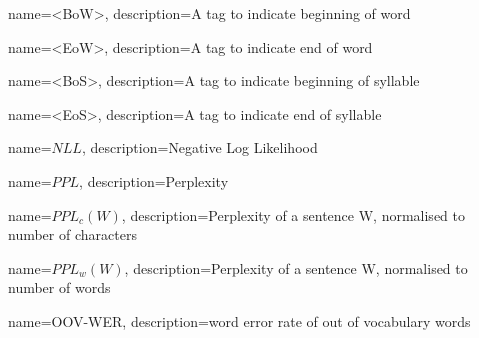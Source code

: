 {   name={\ipa <BoW>},
    description={A tag to indicate beginning of word}
}

{   name={\ipa <EoW>},
    description={A tag to indicate end of word}
}

{   name={\ipa <BoS>},
    description={A tag to indicate beginning of syllable}
}

{   name={\ipa <EoS>},
    description={A tag to indicate end of syllable}
}



{   name=$NLL$,
    description={Negative Log Likelihood}
}



{   name=$PPL$,
    description={Perplexity}
}

{
    name=$PPL_c(W)$,
    description={Perplexity of a sentence W, normalised to number of characters}
}

{
    name=$PPL_w(W)$,
    description={Perplexity of a sentence W, normalised to number of words}
}



{   name=OOV-WER,
    description={word error rate of out of vocabulary words}
}







